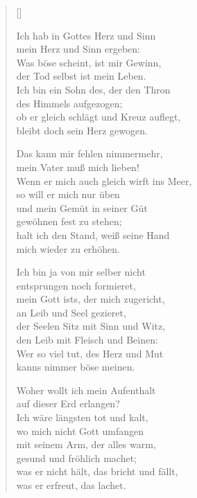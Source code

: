 \begin{multicols}{2}
\settowidth{\versewidth}{Wenn er mich auch gleich wirft ins Meer,}
\begin{verse}[\versewidth]

 Ich hab in Gottes Herz und Sinn\\
mein Herz und Sinn ergeben:\\
Was böse scheint, ist mir Gewinn,\\
der Tod selbst ist mein Leben.\\
Ich bin ein Sohn des, der den Thron\\
des Himmels aufgezogen;\\
ob er gleich schlägt und Kreuz auflegt,\\
bleibt doch sein Herz gewogen.

 Das kann mir fehlen nimmermehr,\\
mein Vater muß mich lieben!\\
Wenn er mich auch gleich wirft ins Meer,\\
so will er mich nur üben\\
und mein Gemüt in seiner Güt\\
gewöhnen fest zu stehen;\\
halt ich den Stand, weiß seine Hand\\
mich wieder zu erhöhen.

 Ich bin ja von mir selber nicht\\
entsprungen noch formieret,\\
mein Gott ists, der mich zugericht,\\
an Leib und Seel gezieret,\\
der Seelen Sitz mit Sinn und Witz,\\
den Leib mit Fleisch und Beinen:\\
Wer so viel tut, des Herz und Mut\\
kanns nimmer böse meinen.

 Woher wollt ich mein Aufenthalt\\
auf dieser Erd erlangen?\\
Ich wäre längsten tot und kalt,\\
wo mich nicht Gott umfangen\\
mit seinem Arm, der alles warm,\\
gesund und fröhlich machet;\\
was er nicht hält, das bricht und fällt,\\
was er erfreut, das lachet.


\end{verse}
\end{multicols}
